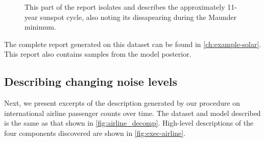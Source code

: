 \begin{figure}[ht!]
\centering
{}
\caption[Automatic description of the solar cycle]
{
This part of the report isolates and describes the approximately 11-year sunspot cycle, also noting its dissapearing during the Maunder minimum.}
\label{fig:periodic}
\end{figure}
%
The complete report generated on this dataset can be found in \cref{ch:example-solar}.
This report also contains samples from the model posterior.



\subsection{Describing changing noise levels} %
\label{sec:airline}


Next, we present excerpts of the description generated by our procedure on international airline passenger counts over time. %
The dataset and model described is the same as that shown in \cref{fig:airline_decomp}.
%
High-level descriptions of the four components discovered are shown in \cref{fig:exec-airline}.

